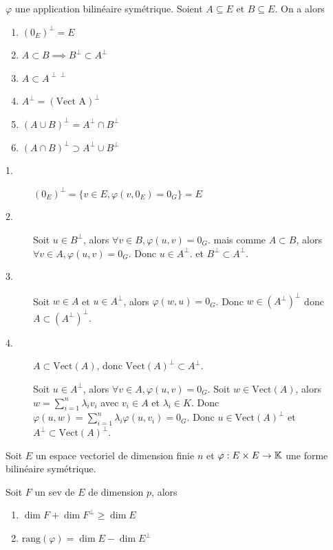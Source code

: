 \documentclass[a4paper, 12pt]{article}
\begin{document}
\begin{proposition}{}{}
    $\varphi$ une application bilinéaire symétrique.
    Soient $A \subseteq E$ et $B \subseteq E$. On a alors
    \begin{enumerate}
        \item $(0_E)^\perp = E$
        \item $A \subset B \implies B^\perp \subset A^\perp$
        \item $A \subset A^{\perp\perp}$
        \item $A^\perp = (\text{Vect A})^\perp$
        \item $(A \cup B)^\perp = A^\perp \cap B^\perp$
        \item $(A \cap B)^\perp \supset A^\perp \cup B^\perp$
    \end{enumerate}
\end{proposition}

\begin{demonstration}
    \begin{description}
        \item[1.]
        $(0_E)^\perp = \{v \in E, \varphi(v, 0_E) = 0_G\} = E$
    
        \item[2.]
        Soit $u \in B^\perp$, alors $\forall v \in B, \varphi(u, v) = 0_G$.
        mais comme $A \subset B$, alors $\forall v \in A, \varphi(u, v) = 0_G$.
        Donc $u \in A^\perp$. et $B^\perp \subset A^\perp$.

        \item[3.]
        Soit $w \in A$ et $u \in A^\perp$, alors $\varphi(w, u) = 0_G$.
        Donc $w \in (A^{\perp})^\perp$ donc $A \subset (A^{\perp})^\perp$.

        \item[4.]
        $A \subset \text{Vect}(A)$, donc $\text{Vect}(A)^\perp \subset A^\perp$.

        Soit $u \in A^\perp$, alors $\forall v \in A, \varphi(u, v) = 0_G$.
        Soit $w \in \text{Vect}(A)$, alors $w = \sum_{i=1}^n \lambda_i v_i$ avec $v_i \in A$ et $\lambda_i \in K$.
        Donc $\varphi(u, w) = \sum_{i=1}^n \lambda_i \varphi(u, v_i) = 0_G$.
        Donc $u \in \text{Vect}(A)^\perp$ et $A^\perp \subset \text{Vect}(A)^\perp$.

    \end{description}
\end{demonstration}

\begin{proposition}{}{}
    Soit $E$ un espace vectoriel de dimension finie $n$ et $\varphi: E \times E \to \mathbb{K}$ une forme bilinéaire symétrique.

    Soit $F$ un sev de $E$ de dimension $p$, alors
    \begin{enumerate}
        \item $\dim F + \dim F^\perp \geq \dim E$
        \item $\text{rang}(\varphi) = \dim E - \dim E^\perp$
    \end{enumerate}
\end{proposition}
\end{document}
